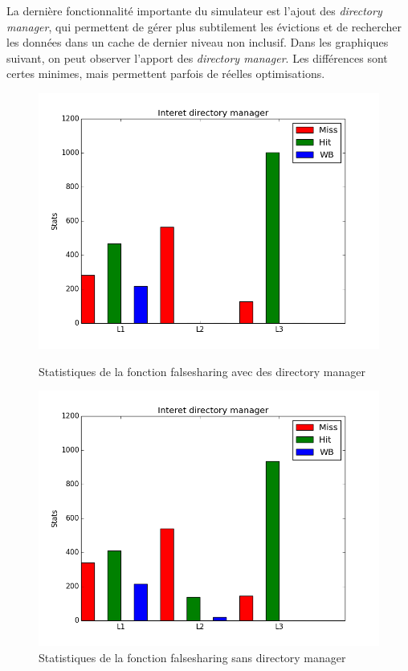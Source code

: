 La dernière fonctionnalité importante du simulateur est l'ajout des \emph{directory manager}, qui permettent de gérer plus subtilement les évictions et de rechercher les données dans un cache de dernier niveau non inclusif. Dans les graphiques suivant, on peut observer l'apport des \emph{directory manager}. Les différences sont certes minimes, mais permettent parfois de réelles optimisations. 

\begin{figure}[H]
   \begin{minipage}[l]{.46\textwidth}
     \includegraphics[scale=0.35]{images/stats_falsesharing_directory.png}
     \caption{\label{img:inclusifs_fs_dm} Statistiques de la fonction falsesharing avec des directory manager}
   \end{minipage} \hfill
   \begin{minipage}[r]{.46\textwidth}
     \includegraphics[scale=0.35]{images/stats_falsesharing_no_directory.png}
     \caption{\label{img:inclusifs_fs_} Statistiques de la fonction falsesharing sans directory manager}
   \end{minipage}
\end{figure}

